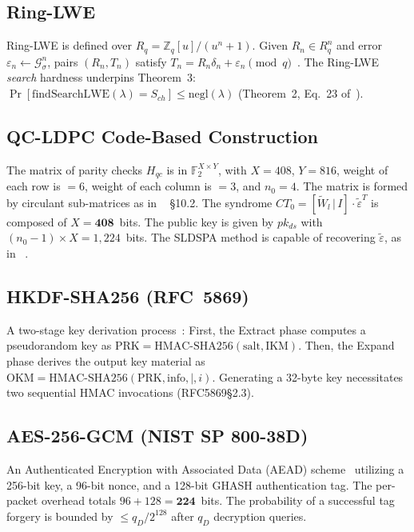 \documentclass[conference]{IEEEtran}
\begin{document}
\subsection{Ring-LWE}

Ring-LWE is defined over $R_q = \mathbb{Z}_q[u]/(u^n+1)$. Given
$R_n \in R_q^n$ and error $\varepsilon_n \leftarrow \mathcal{G}^n_\sigma$,
pairs $(R_n, T_n)$ satisfy $T_n = R_n\delta_n + \varepsilon_n
\pmod{q}$~\cite{lyubashevsky2013,regev2009}. The Ring-LWE
\emph{search} hardness underpins Theorem~3:
$\Pr[\mathrm{findSearchLWE}(\lambda) = S_{ch}] \leq \mathrm{negl}(\lambda)$
(Theorem~2, Eq.~23 of~\cite{kumari2022}).


\subsection{QC-LDPC Code-Based Construction}

The matrix of parity checks $H_{qc}$ is in $\mathbb{F}_2^{X \times Y}$, with $X = 408$,  $Y = 816$, weight of each row is  $= 6$, weight of each column is  $= 3$, and $n_0 = 4$. The matrix is formed by circulant sub-matrices as in ~\cite{kumari2022} \S10.2. The syndrome $CT_0 = [\tilde{W}_l\,|\,I] \cdot \tilde{\varepsilon}^T$ is composed of $X = \mathbf{408}$~bits. The public key is given by $pk_{ds}$ with  $(n_0-1) \times X = 1{,}224$~bits. The SLDSPA method is capable of recovering $\tilde{\varepsilon}$, as in ~\cite{gallager1962,baldi2016}.

\subsection{HKDF-SHA256 (RFC~5869)}

A two-stage key derivation process~\cite{rfc5869}: First, the Extract phase computes a pseudorandom key as $\mathrm{PRK} = \mathrm{HMAC\text{-}SHA256}(\mathrm{salt, IKM})$. Then, the Expand phase derives the output key material as $\mathrm{OKM} = \mathrm{HMAC\text{-}SHA256}(\mathrm{PRK, info},|,i)$. Generating a 32-byte key necessitates two sequential HMAC invocations (RFC5869\S2.3).

\subsection{AES-256-GCM (NIST SP 800-38D)}

An Authenticated Encryption with Associated Data (AEAD) scheme~\cite{nist38d} utilizing a 256-bit key, a 96-bit nonce, and a 128-bit GHASH authentication tag. The per-packet overhead totals $96 + 128 = \mathbf{224}$~bits. The probability of a successful tag forgery is bounded by $\leq q_D/2^{128}$ after $q_D$ decryption queries.
\end{document}
